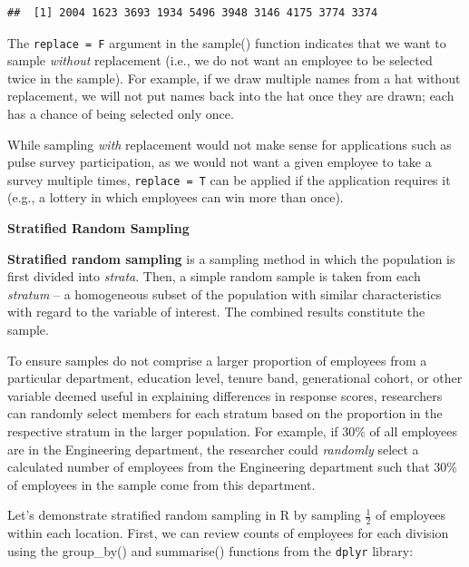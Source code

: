 \documentclass[]{book}
\newenvironment{Shaded}{\begin{snugshade}}{\end{snugshade}}
\newcommand{\CommentTok}[1]{\textcolor[rgb]{0.56,0.35,0.01}{\textit{#1}}}
\newcommand{\DataTypeTok}[1]{\textcolor[rgb]{0.13,0.29,0.53}{#1}}
\newcommand{\KeywordTok}[1]{\textcolor[rgb]{0.13,0.29,0.53}{\textbf{#1}}}
\newcommand{\NormalTok}[1]{#1}
\newcommand{\OperatorTok}[1]{\textcolor[rgb]{0.81,0.36,0.00}{\textbf{#1}}}
\begin{document}
\begin{verbatim}
##  [1] 2004 1623 3693 1934 5496 3948 3146 4175 3774 3374
\end{verbatim}

The \texttt{replace\ =\ F} argument in the sample() function indicates that we want to sample \emph{without} replacement (i.e., we do not want an employee to be selected twice in the sample). For example, if we draw multiple names from a hat without replacement, we will not put names back into the hat once they are drawn; each has a chance of being selected only once.

While sampling \emph{with} replacement would not make sense for applications such as pulse survey participation, as we would not want a given employee to take a survey multiple times, \texttt{replace\ =\ T} can be applied if the application requires it (e.g., a lottery in which employees can win more than once).

\textbf{Stratified Random Sampling}

\textbf{Stratified random sampling} is a sampling method in which the population is first divided into \emph{strata}. Then, a simple random sample is taken from each \emph{stratum} -- a homogeneous subset of the population with similar characteristics with regard to the variable of interest. The combined results constitute the sample.

To ensure samples do not comprise a larger proportion of employees from a particular department, education level, tenure band, generational cohort, or other variable deemed useful in explaining differences in response scores, researchers can randomly select members for each stratum based on the proportion in the respective stratum in the larger population. For example, if 30\% of all employees are in the Engineering department, the researcher could \emph{randomly} select a calculated number of employees from the Engineering department such that 30\% of employees in the sample come from this department.

Let's demonstrate stratified random sampling in R by sampling \(\frac{1}{2}\) of employees within each location. First, we can review counts of employees for each division using the group\_by() and summarise() functions from the \texttt{dplyr} library:

\begin{Shaded}
\end{Shaded}
\end{document}
